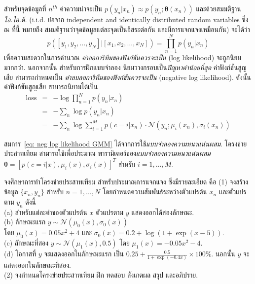 \begin{Exercise}
สำหรับจุดข้อมูลที่ $n^{th}$
ค่าความน่าจะเป็น $p(y_n|x_n) \approx p(y_n; \bm{\theta}(x_n))$
และด้วยสมมติฐาน\textit{ไอ.ไอ.ดี.} (i.i.d. ย่อจาก independent and identically distributed random variables ซึ่ง ณ ที่นี้ หมายถึง สมมติฐานว่าจุดข้อมูลแต่ละจุดเป็นอิสระต่อกัน และมีการแจกแจงเหมือนกัน) 
จะได้ว่า
\[
p([y_1, y_2, \ldots, y_N]|[x_1, x_2, \ldots, x_N]) = \prod_{n=1}^N p(y_n|x_n)
\]
เพื่อความสะดวกในการคำนวณ
\textit{ค่าลอการิทึมของฟังก์ชันควรจะเป็น} (log likelihood) 
จะถูกนิยมมากกว่า.
นอกจากนั้น
สำหรับการฝึกแบบจำลอง นิยมวางกรอบเป็น\textit{ปัญหาค่าน้อยที่สุด}
ค่าฟังก์ชันสูญเสีย สามารถกำหนดเป็น \textit{ค่าลบลอการิทึมของฟังก์ชันควรจะเป็น} (negative log likelihood).
ดังนั้น ค่าฟังก์ชันสูญเสีย สามารถนิยามได้เป็น
\begin{eqnarray}
\mathrm{loss} &=& -\log \prod_{n=1}^N p(y_n|x_n)
\nonumber \\
&=& -\sum_n \log p(y_n|x_n)
\label{eq: neg log likelihood} \\
&=& -\sum_n \log \sum_{i=1}^M p(c=i|x_n) \cdot \mathcal{N}(y_n; \mu_i(x_n), \sigma_i(x_n))
\label{eq: neg log likelihood GMM}
\end{eqnarray}

สมการ~\ref{eq: neg log likelihood GMM} ได้จากการใช้\textit{แบบจำลองความหนาแน่นผสม}.
โครงข่ายประสาทเทียม สามารถใช้เพื่อประมาณ พารามิเตอร์ของ\textit{แบบจำลองความหนาแน่นผสม}
$\bm{\theta} = [p(c=i|x), \mu_i(x), \sigma_i(x)]^T$ สำหรับ $i=1, \ldots, M$.

จงศึกษาการทำโครงข่ายประสาทเทียม สำหรับประมาณการแจกแจง
ซึ่งมีรายละเอียด คือ
(1) จงสร้างข้อมูล $\{x_n,y_n\}$ สำหรับ $n=1, \ldots, N$ 
โดยกำหนดความสัมพันธ์ระหว่างตัวแปรต้น $x_n$ และตัวแปรตาม $y_n$
ดังนี้\\
	(a) สำหรับแต่ละค่าของตัวแปรต้น $x$ ตัวแปรตาม $y$ แสดงออกได้สองลักษณะ. \\
	(b) ลักษณะแรก $y \sim \mathcal{N}(\mu_0(x), \sigma_0(x))$ \\
	โดย $\mu_0(x) = 0.05 x^2 + 4$
	และ $\sigma_0(x) = 0.2 + \log\left(1 + \exp(x-5)\right)$.\\
	(c) ลักษณะที่สอง $y \sim \mathcal{N}(\mu_1(x), 0.5)$
โดย $\mu_1(x) = -0.05 x^2 - 4$. \\
	(d) โอกาสที่ $y$ จะแสดงออกในลักษณะแรก เป็น $0.25+ \frac{0.5}{1 + \exp(-0.4 x)} \times 100\%$. นอกนั้น $y$ จะแสดงออกในลักษณะที่สอง.\\
(2) จงกำหนดโครงข่ายประสาทเทียม ฝึก ทดสอบ สังเกตผล สรุป และอภิปราย.


\end{Exercise}
